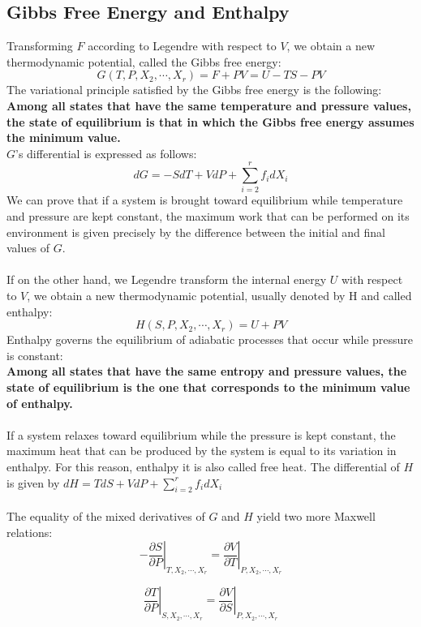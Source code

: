 \documentclass[cyan]{elegantnote}
\begin{document}
\subsection{Gibbs Free Energy and Enthalpy}
Transforming $F$ according to Legendre with respect to $V$, we obtain a new thermodynamic potential, called the Gibbs free energy:
\[G(T,P,X_2,\cdots,X_r) = F + PV = U - TS - PV\]
The variational principle satisfied by the Gibbs free
energy is the following:
\\
\textbf{Among all states that have the same temperature and pressure values, the state of equilibrium is that in which the Gibbs free energy assumes the minimum value.}
\\
$G$'s differential is expressed as follows:
\[dG = -SdT + VdP + \sum_{i=2}^r f_i dX_i \]
We can prove that if a system is brought toward equilibrium while temperature and pressure are kept constant, the maximum work that can be performed on its environment is given precisely by the difference between the initial and final values of $G$.
\\ \\
If on the other hand, we Legendre transform the internal energy $U$ with respect to $V$, we obtain a new thermodynamic potential, usually denoted by H and called enthalpy:
\[H(S,P,X_2,\cdots,X_r) = U + PV\]
Enthalpy governs the equilibrium of adiabatic processes that occur while pressure is constant:
\\
\textbf{Among all states that have the same entropy and pressure values, the state of equilibrium is the one that corresponds to the minimum value of enthalpy.}
\\ \\
If a system relaxes toward equilibrium while the pressure is kept constant, the maximum heat that can be produced by the system is equal to its variation in enthalpy. For this reason, enthalpy it is also called free heat.
The differential of $H$ is given by
$dH = TdS + VdP + \sum_{i=2}^r f_i dX_i$
\\ \\
The equality of the mixed derivatives of $G$ and $H$ yield two more Maxwell relations:
\[\left. -\frac{\partial S}{\partial P} \right|_{T,X_2,\cdots,X_r} = \left. \frac{\partial V}{\partial T} \right|_{P,X_2,\cdots,X_r}\]

\[\left. \frac{\partial T}{\partial P} \right|_{S,X_2,\cdots,X_r} = \left. \frac{\partial V}{\partial S} \right|_{P,X_2,\cdots,X_r}\]
\end{document}
